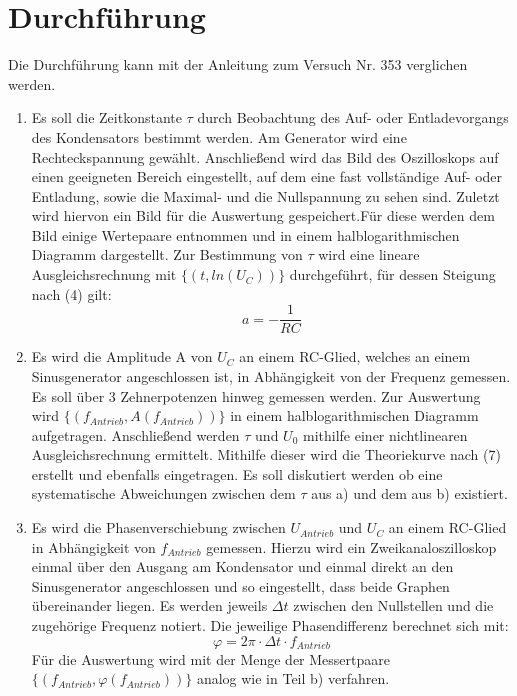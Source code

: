 \section{Durchführung}
\label{sec:Durchführung}
Die Durchführung kann mit der Anleitung zum Versuch Nr. 353 \cite{V353} verglichen werden.
\renewcommand{\labelenumi}{\alph{enumi})}
\begin{enumerate}
  \item Es soll die Zeitkonstante $\tau$ durch Beobachtung des Auf- oder Entladevorgangs
  des Kondensators bestimmt werden. Am Generator wird eine Rechteckspannung gewählt.
  Anschließend wird das Bild des Oszilloskops auf einen
  geeigneten Bereich eingestellt, auf dem eine fast vollständige Auf- oder Entladung, sowie
  die Maximal- und die Nullspannung zu sehen sind. Zuletzt wird hiervon ein Bild für die
  Auswertung gespeichert.Für diese werden dem Bild einige Wertepaare entnommen und in einem
  halblogarithmischen Diagramm dargestellt. Zur Bestimmung von $\tau$ wird eine
  lineare Ausgleichsrechnung mit $\{(t, ln(U_C))\}$ durchgeführt, für dessen Steigung nach (4) gilt:
  \begin{equation}
  a = -\frac{1}{RC}
  \end{equation}

  \item Es wird die Amplitude A von $U_C$ an einem RC-Glied, welches an einem Sinusgenerator
   angeschlossen ist, in Abhängigkeit von der Frequenz gemessen. Es soll über
   3 Zehnerpotenzen hinweg gemessen werden. Zur Auswertung wird $\{(f_{Antrieb}, A(f_{Antrieb}))\}$
   in einem halblogarithmischen Diagramm aufgetragen. Anschließend werden $\tau$ und $U_0$ mithilfe einer nichtlinearen
    Ausgleichsrechnung ermittelt. Mithilfe dieser wird die Theoriekurve nach (7) erstellt und
    ebenfalls eingetragen. Es soll diskutiert werden ob eine systematische Abweichungen
    zwischen dem $\tau$ aus a) und dem aus b) existiert.



    \item Es wird die Phasenverschiebung zwischen $U_{Antrieb}$ und $U_C$ an einem
    RC-Glied in Abhängigkeit von $f_{Antrieb}$ gemessen. Hierzu wird ein Zweikanaloszilloskop
    einmal über den Ausgang am Kondensator und einmal direkt an den Sinusgenerator angeschlossen
     und so eingestellt, dass beide Graphen übereinander liegen. Es werden jeweils
      $\Delta t$ zwischen den Nullstellen und die zugehörige Frequenz notiert. Die jeweilige
       Phasendifferenz berechnet sich mit:
       \begin{equation}
         \varphi = 2 \pi \cdot \Delta t \cdot f_{Antrieb}
       \end{equation}
       Für die Auswertung wird mit der Menge der Messertpaare $\{(f_{Antrieb}, \varphi(f_{Antrieb}))\}$
       analog wie in Teil b) verfahren.


\end{enumerate}
